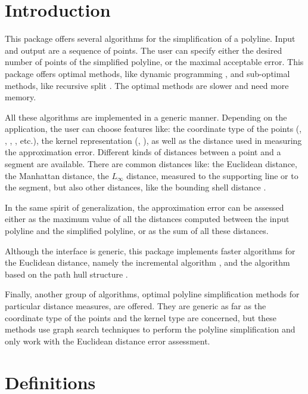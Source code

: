 \label{chap:simplify_polyline}


\section{Introduction}

This package offers several algorithms for the simplification of a
polyline. Input and output are a sequence of points.  The user can
specify either the desired number of points of the simplified polyline,
or the maximal acceptable error. This package offers optimal methods, like
dynamic programming \cite{[cgal:gt-dpasrcp-93]}, and sub-optimal methods, 
like recursive split \cite{[dp-arnpr-73]}. The optimal methods
are slower and need more memory.

All these algorithms are implemented in a generic manner. Depending on
the application, the user can choose features like: the coordinate type of the
points (, , , ,
etc.), the kernel representation (, ),
as well as the distance used in measuring the approximation error.
Different kinds of distances between a point and a segment are available. 
There are common distances like: the Euclidean distance, the Manhattan distance,
the $L_\infty$ distance, measured to the supporting line or to the segment, but
also other distances, like the bounding shell distance \cite{[cgal:v-hal-94]}. 

In the same spirit of generalization, the approximation error can be assessed either as
the maximum value of all the distances computed between the input
polyline and the simplified polyline, or as the sum of all
these distances.

Although the interface is generic, this package implements faster algorithms
for the Euclidean distance, namely the incremental algorithm \cite{[cgal:pv-opadc-94]},
and the algorithm based on the path hull structure \cite{[hs-sudpl-92]}.

Finally, another group of algorithms, optimal polyline simplification methods
for particular distance measures, are offered. They are generic
as far as the coordinate type of the points and the kernel type are
concerned, but these methods use graph search techniques \cite{[cgal:ii-pac]} to
perform the polyline simplification and only work with the Euclidean distance error
assessment.

\section{Definitions}

